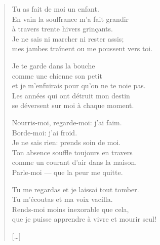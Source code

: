 \documentclass[11pt]{extbook}
\newcommand*{\centeredornament}{\centerline{\pgfornament[width=6cm]{88}}}
\begin{document}
\begin{verse}
  Tu as fait de moi un enfant. \\
  En vain la souffrance m'a fait grandir \\
  à travers trente hivers grinçants. \\
  Je ne sais ni marcher ni rester assis; \\
  mes jambes traînent ou me poussent vers toi.

  Je te garde dans la bouche \\
  comme une chienne son petit \\
  et je m'enfuirais pour qu'on ne te noie pas. \\
  Les années qui ont détruit mon destin \\
  se déversent sur moi à chaque moment.

  Nourris-moi, regarde-moi: j'ai faim. \\
  Borde-moi: j'ai froid. \\
  Je ne sais rien: prends soin de moi. \\
  Ton absence souffle toujours en travers \\
  comme un courant d'air dans la maison. \\
  Parle-moi --- que la peur me quitte.

  Tu me regardas et je laissai tout tomber. \\
  Tu m'écoutas et ma voix vacilla. \\
  Rends-moi moins inexorable que cela, \\
  que je puisse apprendre à vivre et mourir seul!\hspace*{-1mm}

  \hfill [\ldots]
\end{verse}

\newpage

\vspace*{-15mm}
\centeredornament


\end{document}
